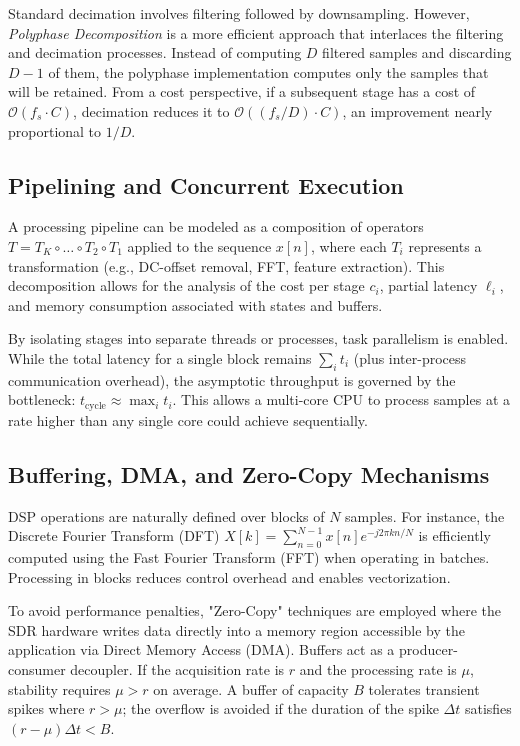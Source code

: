 \documentclass[11pt]{article}
\begin{document}
Standard decimation involves filtering followed by downsampling. However, \emph{Polyphase Decomposition} is a more efficient approach that interlaces the filtering and decimation processes. Instead of computing $D$ filtered samples and discarding $D-1$ of them, the polyphase implementation computes only the samples that will be retained. From a cost perspective, if a subsequent stage has a cost of $\mathcal{O}(f_s \cdot C)$, decimation reduces it to $\mathcal{O}((f_s/D) \cdot C)$, an improvement nearly proportional to $1/D$.

\subsection{Pipelining and Concurrent Execution}
A processing pipeline can be modeled as a composition of operators $T = T_K \circ \dots \circ T_2 \circ T_1$ applied to the sequence $x[n]$, where each $T_i$ represents a transformation (e.g., DC-offset removal, FFT, feature extraction). This decomposition allows for the analysis of the cost per stage $c_i$, partial latency $\ell_i$, and memory consumption associated with states and buffers.

By isolating stages into separate threads or processes, task parallelism is enabled. While the total latency for a single block remains $\sum_i t_i$ (plus inter-process communication overhead), the asymptotic throughput is governed by the bottleneck: $t_{\text{cycle}} \approx \max_i t_i$. This allows a multi-core CPU to process samples at a rate higher than any single core could achieve sequentially.

\subsection{Buffering, DMA, and Zero-Copy Mechanisms}
DSP operations are naturally defined over blocks of $N$ samples. For instance, the Discrete Fourier Transform (DFT) $X[k] = \sum_{n=0}^{N-1} x[n]e^{-j2\pi kn/N}$ is efficiently computed using the Fast Fourier Transform (FFT) when operating in batches. Processing in blocks reduces control overhead and enables vectorization.

To avoid performance penalties, "Zero-Copy" techniques are employed where the SDR hardware writes data directly into a memory region accessible by the application via Direct Memory Access (DMA). Buffers act as a producer-consumer decoupler. If the acquisition rate is $r$ and the processing rate is $\mu$, stability requires $\mu > r$ on average. A buffer of capacity $B$ tolerates transient spikes where $r > \mu$; the overflow is avoided if the duration of the spike $\Delta t$ satisfies $(r-\mu)\Delta t < B$.
\end{document}
